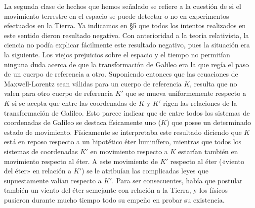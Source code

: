 \documentclass[spanish]{book}
\begin{document}
La segunda clase de hechos que hemos señalado se refiere a la cuestión de si el
movimiento terrestre en el espacio se puede detectar o no en experimentos efectuados
en la Tierra. Ya indicamos en \S 5 que todos los intentos realizados en este sentido
dieron resultado negativo. Con anterioridad a la teoría relativista, la ciencia no podía
explicar fácilmente este resultado negativo, pues la situación era la siguiente. Los
viejos prejuicios sobre el espacio y el tiempo no permitían ninguna duda acerca de
que la transformación de Galileo era la que regía el paso de un cuerpo de referencia a
otro. Suponiendo entonces que las ecuaciones de Maxwell-Lorentz sean válidas para
un cuerpo de referencia $K$, resulta que no valen para otro cuerpo de referencia $K'$ que
se mueva uniformemente respecto a $K$ si se acepta que entre las coordenadas de $K$ y
$K'$ rigen las relaciones de la transformación de Galileo. Esto parece indicar que de
entre todos los sistemas de coordenadas de Galileo se destaca físicamente uno ($K$) que
posee un determinado estado de movimiento. Físicamente se interpretaba este
resultado diciendo que $K$ está en reposo respecto a un hipotético éter luminífero,
mientras que todos los sistemas de coordenadas $K'$ en movimiento respecto a $K$
estarían también en movimiento respecto al éter. A este movimiento de $K'$ respecto al
éter («viento del éter» en relación a $K'$) se le atribuían las complicadas leyes que
supuestamente valían respecto a $K'$. Para ser consecuentes, había que postular también
un viento del éter semejante con relación a la Tierra, y los físicos pusieron durante
mucho tiempo todo su empeño en probar su existencia.
\end{document}
